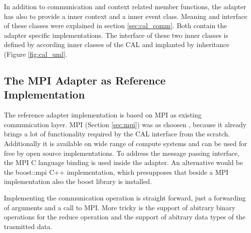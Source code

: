   In addition to communication and context related member functions,
  the adapter has also to provide a inner context and a inner event
  class. Meaning and interface of these classes were explained in
  section \ref{sec:cal_comm}. Both contain the adapter specific
  implementations. The interface of these two inner classes is defined
  by according inner classes of the CAL and implanted by inheritance
  (Figure \ref{fig:cal_uml}.


\subsection{The MPI Adapter as Reference Implementation}
\label{sec:cal_mpi_adapter}
  The reference adapter implementation is based on MPI as existing
  communication layer.  MPI (Section \ref{sec:mpi}) was as choosen ,
  because it already brings a lot of functionality required by the CAL
  interface from the scratch. Additionally it is available on wide
  range of compute systems and can be used for free by open source
  implementations. To address the message passing interface, the MPI C
  language binding is used inside the adapter. An alternative would be
  the boost::mpi C++ implementation, which presupposes that beside a
  MPI implementation also the boost library is installed.

  Implementing the communication operation is straight forward, just a
  forwarding of arguments and a call to MPI. More tricky is the
  support of abitrary binary operations for the reduce operation and
  the support of abitrary data types of the trasmitted data.

